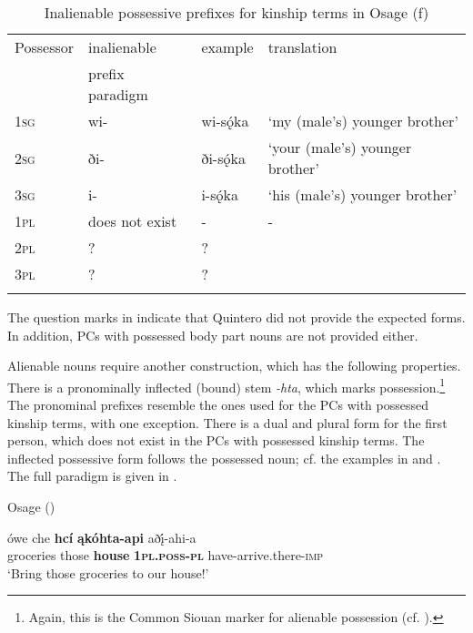 \documentclass[output=paper]{LSP/langsci}
\begin{document}
\begin{table}
\caption{Inalienable possessive prefixes for kinship terms in Osage (\citealt[481]{Quintero2004}f)} \label{osageinalienable}
\begin{tabular}{ l l l l }
\lsptoprule
Possessor	 & inalienable & example & translation \\
& prefix paradigm & & \\
\midrule
\textsc{1sg} & wi-	& wi-sǫ́ka & `my (male's) younger brother' \\
 
\textsc{2sg} & ði- & ði-sǫ́ka & `your (male's) younger brother' \\
 
\textsc{3sg} & i- & i-sǫ́ka & `his (male's) younger brother' \\
 
\textsc{1pl} & does not exist &	- & - \\
 
\textsc{2pl} & ? & ? & \\
 
\textsc{3pl} & ? & ? & \\
\lspbottomrule
\end{tabular}
\end{table}
 
The question marks in  indicate that Quintero did not provide the expected forms. In addition, PCs with possessed body part nouns are not provided either.

Alienable nouns require another construction, which has the following properties. There is a pronominally inflected (bound) stem \textit{-hta}, which marks possession.\footnote{Again, this is the Common Siouan marker for alienable possession (cf. \citealt{RankinEtAl2015}).} The pronominal prefixes resemble the ones used for the PCs with possessed kinship terms, with one exception. There is a dual and plural form for the first person, which does not exist in the PCs with possessed kinship terms. The inflected possessive form follows the possessed noun; cf. the examples in  and . The full paradigm is given in .

\ea	Osage (\citealt[298]{Quintero2004}) \label{osagegroceries}

\gll ówe  che    \textbf{hc\'i} \textbf{ \k{a}kóhta-api}  aðį́-ahi-a \\
groceries  those \textbf{house} \textbf{\textsc{1pl.poss-pl}}   have-arrive.there-\textsc{imp} \\
\glt `Bring those groceries to our house!'
\end{document}
